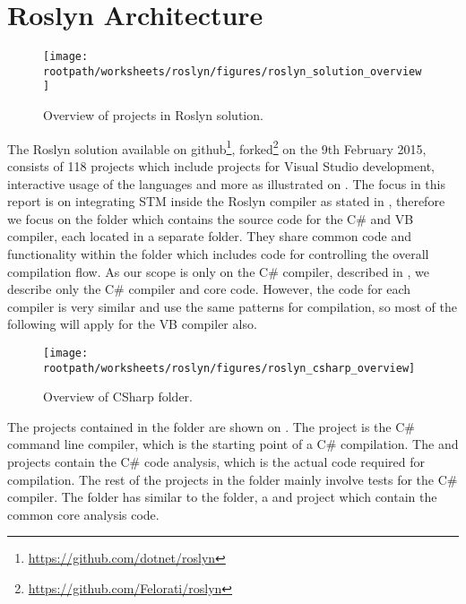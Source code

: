 \section{Roslyn Architecture}\label{sec:roslyn_archi}
\begin{figure}[htbp]
\centering
 \texttt{[image: \\rootpath/worksheets/roslyn/figures/roslyn\_solution\_overview]} 
 \caption{Overview of projects in Roslyn solution.}
\label{fig:roslyn_solution_overview}
\end{figure}

The Roslyn solution available on github\footnote{\url{https://github.com/dotnet/roslyn}}, forked\footnote{\url{https://github.com/Felorati/roslyn}} on the 9th February 2015, consists of 118 projects which include projects for Visual Studio development, interactive usage of the languages and more as illustrated on . The focus in this report is on integrating \ac{STM} inside the Roslyn compiler as stated in , therefore we focus on the  folder which contains the source code for the C\# and \ac{VB} compiler, each located in a separate folder. They share common code and functionality within the  folder which includes code for controlling the overall compilation flow. As our scope is only on the C\# compiler, described in , we describe only the C\# compiler and core code. However, the code for each compiler is very similar and use the same patterns for compilation\cite[09:36-10:36]{campbellDeeperRos}, so most of the following will apply for the \ac{VB} compiler also.

\begin{figure}[htbp]
\centering
 \texttt{[image: \\rootpath/worksheets/roslyn/figures/roslyn\_csharp\_overview]} 
 \caption{Overview of CSharp folder.}
\label{fig:roslyn_csharp_overview}
\end{figure}

The projects contained in the  folder are shown on . The  project is the C\# command line compiler, which is the starting point of a C\# compilation. The  and  projects contain the C\# code analysis, which is the actual code required for compilation. The rest of the projects in the  folder mainly involve tests for the C\# compiler. The  folder has similar to the  folder, a   and  project which contain the common core analysis code.

